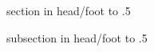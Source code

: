 {%
  \leavevmode%
  \begin{beamercolorbox}[wd=.5\paperwidth,ht=3ex,dp=1.5ex]{section in head/foot}%
    \hbox to .5\paperwidth{\hfil\insertsectionhead\hspace*{5pt}}
  \end{beamercolorbox}%
  \begin{beamercolorbox}[wd=.5\paperwidth,ht=3ex,dp=1.5ex]{subsection in head/foot}%
    \hbox to .5\paperwidth{\hspace*{5pt}\insertsubsectionhead\hfil}
  \end{beamercolorbox}%
  \vspace*{1pt}
}
